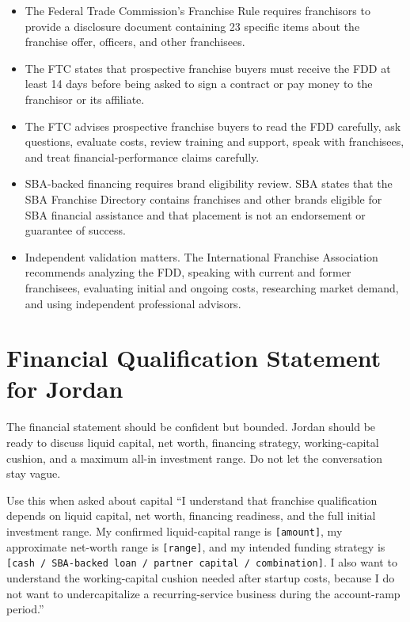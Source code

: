 \documentclass[11pt]{article}
\newcommand{\placeholder}[1]{\textcolor{accent}{\texttt{[#1]}}}
\begin{document}
\begin{itemize}
  \item The Federal Trade Commission's Franchise Rule requires franchisors to provide a disclosure document containing 23 specific items about the franchise offer, officers, and other franchisees.\cite{ftc-rule}
  \item The FTC states that prospective franchise buyers must receive the FDD at least 14 days before being asked to sign a contract or pay money to the franchisor or its affiliate.\cite{ftc-consumer-guide,ftc-deep-dive}
  \item The FTC advises prospective franchise buyers to read the FDD carefully, ask questions, evaluate costs, review training and support, speak with franchisees, and treat financial-performance claims carefully.\cite{ftc-consumer-guide,ftc-deep-dive}
  \item SBA-backed financing requires brand eligibility review. SBA states that the SBA Franchise Directory contains franchises and other brands eligible for SBA financial assistance and that placement is not an endorsement or guarantee of success.\cite{sba-directory}
  \item Independent validation matters. The International Franchise Association recommends analyzing the FDD, speaking with current and former franchisees, evaluating initial and ongoing costs, researching market demand, and using independent professional advisors.\cite{ifa-diligence}
\end{itemize}

\section{Financial Qualification Statement for Jordan}

The financial statement should be confident but bounded. Jordan should be ready to discuss liquid capital, net worth, financing strategy, working-capital cushion, and a maximum all-in investment range. Do not let the conversation stay vague.

\begin{scriptbox}{Use this when asked about capital}
``I understand that franchise qualification depends on liquid capital, net worth, financing readiness, and the full initial investment range. My confirmed liquid-capital range is \placeholder{amount}, my approximate net-worth range is \placeholder{range}, and my intended funding strategy is \placeholder{cash / SBA-backed loan / partner capital / combination}. I also want to understand the working-capital cushion needed after startup costs, because I do not want to undercapitalize a recurring-service business during the account-ramp period.''
\end{scriptbox}
\end{document}
